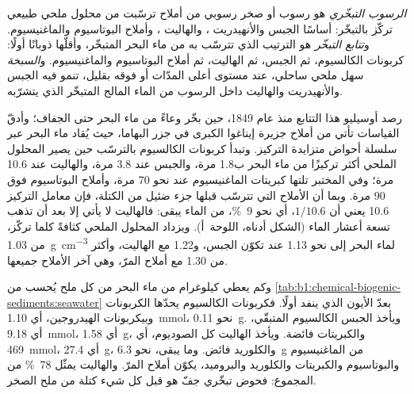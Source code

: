 \begin{definition}\label{def:b1:chemical-biogenic-sediments:evaporite}
\emph{الرسوب التبخّري} هو رسوب أو صخر رسوبي من أملاح ترسّبت من محلول ملحي طبيعي تركّز بالتبخّر: أساسًا الجبس  والأنهيدريت ، والهاليت ، وأملاح البوتاسيوم والماغنيسيوم. و\emph{تتابع التبخّر} هو الترتيب الذي تترسّب به  من ماء البحر المتبخّر، وأقلّها ذوبانًا أولًا: كربونات الكالسيوم، ثم الجبس، ثم الهاليت، ثم أملاح البوتاسيوم والماغنيسيوم. و\emph{السبخة} سهل ملحي ساحلي، عند مستوى أعلى المدّات أو فوقه بقليل، تنمو فيه الجبس والأنهيدريت والهاليت داخل الرسوب من الماء المالح المتبخّر الذي يتشرّبه.
\end{definition}

رصد أوسيليو هذا التتابع منذ عام 1849، حين بخّر وعاءً من ماء البحر حتى الجفاف؛ وأدقّ القياسات تأتي من أملاح جزيرة إيناغوا الكبرى في جزر البهاما، حيث يُقاد ماء البحر عبر سلسلة أحواض متزايدة التركيز. وتبدأ كربونات الكالسيوم بالترسّب حين يصير المحلول الملحي أكثر تركيزًا من ماء البحر ب\num{1.8} مرة، والجبس عند 3.8 مرة، والهاليت عند 10.6 مرة؛ وفي المختبر تلتها كبريتات الماغنيسيوم عند نحو 70 مرة، وأملاح البوتاسيوم فوق 90 مرة. وبما أن الأملاح التي تترسّب قبلها جزء ضئيل من الكتلة، فإن معامل التركيز 10.6 يعني أن $1/10.6$، أي نحو \qty{9}{\%}، من الماء يبقى: فالهاليت لا يأتي إلا بعد أن تذهب تسعة أعشار الماء (الشكل أدناه، اللوحة~أ). ويزداد المحلول الملحي كثافةً كلما تركّز، من \qty{1.03}{g.cm^{-3}} لماء البحر إلى نحو \num{1.13} عند تكوّن الجبس، و\num{1.22} مع الهاليت، وأكثر من \num{1.30} مع أملاح المرّ، وهي آخر الأملاح جميعها.

وكم يعطي كيلوغرام من ماء البحر من كل ملح يُحسب من \cref{tab:b1:chemical-biogenic-sediments:seawater} بعدّ الأيون الذي ينفد أولًا. فكربونات الكالسيوم يحدّها الكربونات وبيكربونات الهيدروجين، أي \qty{1.10}{mmol}، نحو \qty{0.11}{g}. ويأخذ الجبس الكالسيوم المتبقّي، أي \qty{9.18}{mmol}، أي \qty{1.58}{g}، والكبريتات فائضة. ويأخذ الهاليت كل الصوديوم، أي \qty{469}{mmol}، أي \qty{27.4}{g}، والكلوريد فائض. وما يبقى، نحو \qty{6.3}{g} من الماغنيسيوم والبوتاسيوم والكبريتات والكلوريد والبروميد، يكوّن أملاح المرّ. والهاليت يمثّل \qty{78}{\%} من المجموع: فحوض تبخّري جفّ هو قبل كل شيء كتلة من ملح الصخر.

